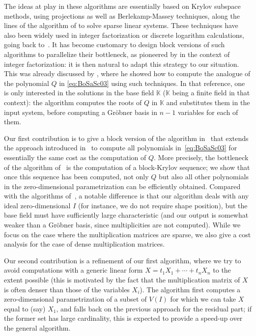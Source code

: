 \documentclass[final,1p,times,authoryear]{elsarticle}
\newcommand{\lf}{X}
\newcommand{\sqfree}{Q}
\def\K{\mathbb{K}}
\def\K {\ensuremath{\mathbb{K}}}
\begin{document}
The ideas at play in these algorithms are essentially based on Krylov subspace
methods, using projections as well as Berlekamp-Massey techniques, along the
lines of the algorithm of \citet{Wiedemann86} to solve sparse linear systems.
These techniques have also been widely used in integer
factorization or discrete logarithm calculations, going back to~\citep{LaOd90}.
It has become customary to design block versions of such algorithms to
parallelize their bottleneck, as pioneered by \citet{Coppersmith94}
in the context of integer factorization: it is then natural to adapt this
strategy to our situation. This was already discussed by
\citet{Steel15}, where he showed how to compute the analogue of the
polynomial $\sqfree$ in \cref{eq:BoSaSc03} using such techniques. In that
reference, one is only interested in the solutions in the base field $\K$ ($\K$
being a finite field in that context): the algorithm computes the roots of
$\sqfree$ in $\K$ and substitutes them in the input system, before computing a
Gr\"obner basis in $n-1$ variables for each of them.

Our first contribution is to give a block version of the algorithm
in~\citep{BoSaSc03} that extends the approach introduced
in~\citep{Steel15} to compute all polynomials in~\cref{eq:BoSaSc03} for
essentially the same cost as the computation of $\sqfree$. More
precisely, the bottleneck of the algorithm of~\citep{Steel15} is the
computation of a block-Krylov sequence; we show that once this
sequence has been computed, not only $\sqfree$ but also all other
polynomials in the zero-dimensional parametrization can be efficiently
obtained. Compared with the algorithms of~\citep{FaMo17}, a notable
difference is that our algorithm deals with any ideal zero-dimensional
$I$ (for instance, we do not require shape position), but the
base field must have sufficiently large characteristic (and our output is
somewhat weaker than a Gr\"obner basis, since multiplicities are not
computed). While we focus on the case where the multiplication
matrices are sparse, we also give a cost analysis for the case of
dense multiplication matrices.

Our second contribution is a refinement of our first algorithm, where
we try to avoid computations with a generic linear form $\lf =t_1 X_1 +
\cdots + t_n X_n$ to the extent possible (this is motivated by the
fact that the multiplication matrix of $\lf$ is often denser than those
of the variables $X_i$). The algorithm first computes a zero-dimensional
parametrization of a subset of $V(I)$ for which we can take $\lf$
equal to (say) $X_1$, and falls back on the previous approach for the
residual part; if the former set has large cardinality, this is
expected to provide a speed-up over the general algorithm.
\end{document}
